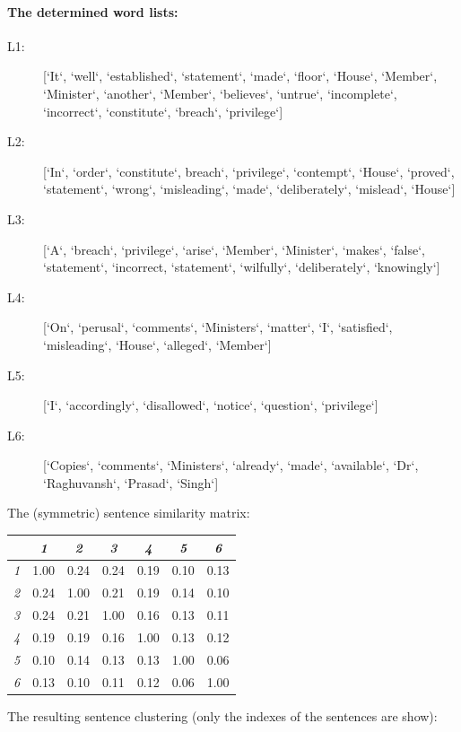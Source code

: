 \paragraph*{The determined word lists:}
\begin{description}
\item[L1:][`It`, `well`, `established`, `statement`, `made`, `floor`, `House`, `Member`, `Minister`, `another`, `Member`, `believes`, `untrue`, `incomplete`, `incorrect`, `constitute`, `breach`, `privilege`]
\item[L2:] [`In`, `order`, `constitute`, breach`, `privilege`, `contempt`, `House`, `proved`, `statement`, `wrong`, `misleading`, `made`, `deliberately`, `mislead`, `House`]
\item[L3:] [`A`, `breach`, `privilege`, `arise`, `Member`, `Minister`, `makes`, `false`, `statement`, `incorrect, `statement`, `wilfully`, `deliberately`, `knowingly`]
\item[L4:] [`On`, `perusal`, `comments`, `Ministers`, `matter`, `I`, `satisfied`, `misleading`, `House`, `alleged`, `Member`]
\item[L5:] [`I`, `accordingly`, `disallowed`, `notice`, `question`, `privilege`]
\item[L6:] [`Copies`, `comments`, `Ministers`, `already`, `made`, `available`, `Dr`, `Raghuvansh`, `Prasad`, `Singh`]
\end{description}
\par
The (symmetric) sentence similarity matrix:
\begin{center}
  \begin{tabular}{ | l | c | c | c | c | c | c | }
    \hline
	& \emph{1} & \emph{2} & \emph{3} & \emph{4} & \emph{5} & \emph{6} \\ \hline
    \emph{1} & 1.00 & 0.24 & 0.24 & 0.19 & 0.10 & 0.13  \\ \hline
	\emph{2} & 0.24 & 1.00 & 0.21 & 0.19 & 0.14 & 0.10  \\ \hline
	\emph{3} & 0.24 & 0.21 & 1.00 & 0.16 & 0.13 & 0.11  \\ \hline
	\emph{4} & 0.19 & 0.19 & 0.16 & 1.00 & 0.13 & 0.12  \\ \hline
	\emph{5} & 0.10 & 0.14 & 0.13 & 0.13 & 1.00 & 0.06  \\ \hline
	\emph{6} & 0.13 & 0.10 & 0.11 & 0.12 & 0.06 & 1.00  \\ \hline
  \end{tabular}
\end{center}
\par
The resulting sentence clustering (only the indexes of the sentences are show):
